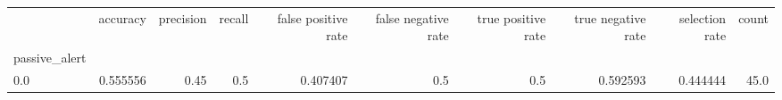 \begin{tabular}{lrrrrrrrrr}
\toprule
{} &  accuracy &  precision &  recall &  false positive rate &  false negative rate &  true positive rate &  true negative rate &  selection rate &  count \\
passive\_alert &           &            &         &                      &                      &                     &                     &                 &        \\
\midrule
0.0           &  0.555556 &       0.45 &     0.5 &             0.407407 &                  0.5 &                 0.5 &            0.592593 &        0.444444 &   45.0 \\
\bottomrule
\end{tabular}
